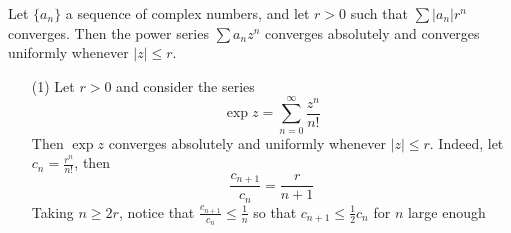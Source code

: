 \begin{theorem}\label{2.2.9}
    Let $\{a_n\}$ a sequence of complex numbers, and let $r>0$ such that
    $\sum{|a_n|r^n}$ converges. Then the power series $\sum{a_nz^n}$ converges
    absolutely and converges uniformly whenever $|z| \leq r$.
\end{theorem}

\begin{example}\label{example_2.3}
    \begin{enumerate}
        \item[(1)] Let $r>0$ and consider the series
            \begin{equation*}
                \exp{z}=\sum_{n=0}^\infty{\frac{z^n}{n!}}
            \end{equation*}
        Then $\exp{z}$ converges absolutely and uniformly whenever $|z| \leq
        r$. Indeed, let $c_n=\frac{r^n}{n!}$, then
        \begin{equation*}
            \frac{c_{n+1}}{c_n}=\frac{r}{n+1}
        \end{equation*}
        Taking $n \geq 2r$, notice that  $\frac{c_{n+1}}{c_n} \leq \frac{1}{n}$
        so that $c_{n+1} \leq \frac{1}{2}c_n$ for $n$ large enough
    \end{enumerate}
\end{example}
